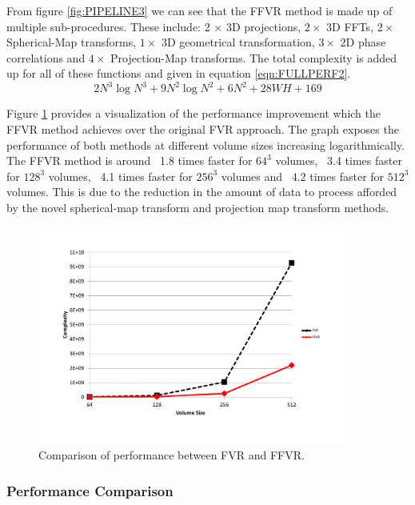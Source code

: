 From figure \ref{fig:PIPELINE3} we can see that the FFVR method is made up of multiple sub-procedures. These include: 2 $\times$ 3D projections, $2 \times$ 3D FFTs, $2 \times$ Spherical-Map transforms, $1 \times$ 3D geometrical transformation, $3 \times$ 2D phase correlations and $4 \times$ Projection-Map transforms. The total complexity is added up for all of these functions and given in equation \ref{eqn:FULLPERF2}. \\

\begin{equation} \label{eqn:FULLPERF2}
2N^3\log{N^3} + 9N^2\log{N^2} + 6N^2 + 28WH + 169
\end{equation}

Figure \ref{fig:perfComp} provides a visualization of the performance improvement which the FFVR method achieves over the original FVR approach. The graph exposes the performance of both methods at different volume sizes increasing logarithmically. The FFVR method is around ~1.8 times faster for $64^3$ volumes, ~3.4 times faster for $128^3$ volumes, ~4.1 times faster for $256^3$ volumes and ~4.2 times faster for $512^3$ volumes. This is due to the reduction in the amount of data to process afforded by the novel spherical-map transform and projection map transform methods.

\begin{figure}[!htb]
\centering
\includegraphics[width=4.0in]{images/methodology/FVR/performanceImprovement}
\caption{Comparison of performance between FVR and FFVR.}
\label{fig:perfComp}
\end{figure}

\subsubsection{Performance Comparison}

